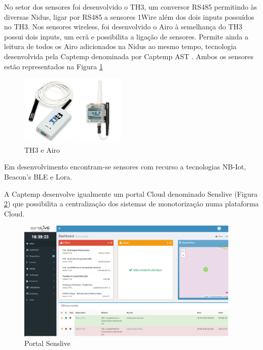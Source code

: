 No setor dos sensores foi desenvolvido o TH3, um conversor RS485 permitindo às diversas Nidus, ligar por RS485 a sensores 1Wire além dos dois inputs possuídos no TH3. Nos sensores wireless, foi desenvolvido o Airo à semelhança do TH3 possui dois inputs, um ecrã e possibilita a ligação de sensores. Permite ainda a leitura de todos os Airo adicionados na Nidus ao mesmo tempo, tecnologia desenvolvida pela Captemp denominada por Captemp AST \cite{Captemp_AST}. Ambos os sensores estão representados na Figura \ref{figairoth3} 
\begin{figure}[ht]
  \centering
  \includegraphics[width=0.45\textwidth]{images/th3airo.png}
  \caption{ TH3 e Airo}\label{figairoth3}
\end{figure}
\par
Em desenvolvimento encontram-se sensores com recurso a tecnologias NB-Iot, Beacon's BLE e Lora.
\par
A Captemp desenvolve igualmente um portal Cloud denominado Senslive (Figura \ref{figsenslive}) que possibilita a centralização dos sistemas de monotorização numa plataforma Cloud.

\begin{figure}[ht]
  \centering
  \includegraphics[width=0.95\textwidth]{images/mwsnap0791.png}
  \caption{ Portal Senslive}\label{figsenslive}
\end{figure}



